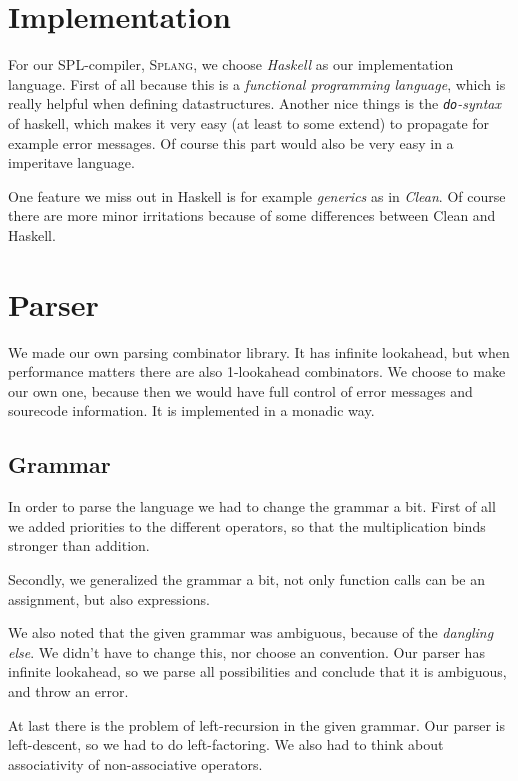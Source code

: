 \documentclass[14pt]{amsart}
\title{\splang}
\author{Wouter Geraedts (0814857) \and Joshua Moerman (3009048)}
\date{}
\newcommand{\splang}{\textsc{Splang}\xspace}
\begin{document}
\maketitle

\tableofcontents

\section{Implementation}
For our SPL-compiler, \splang, we choose \emph{Haskell} as our implementation language. First of all because this is a \emph{functional programming language}, which is really helpful when defining datastructures. Another nice things is the \emph{\texttt{do}-syntax} of haskell, which makes it very easy (at least to some extend) to propagate for example error messages. Of course this part would also be very easy in a imperitave language.

One feature we miss out in Haskell is for example \emph{generics} as in \emph{Clean}. Of course there are more minor irritations because of some differences between Clean and Haskell.

\section{Parser}
We made our own parsing combinator library. It has infinite lookahead, but when performance matters there are also 1-lookahead combinators. We choose to make our own one, because then we would have full control of error messages and sourecode information. It is implemented in a monadic way.

\subsection{Grammar}
In order to parse the language we had to change the grammar a bit. First of all we added priorities to the different operators, so that the multiplication binds stronger than addition.

Secondly, we generalized the grammar a bit, not only function calls can be an assignment, but also expressions.

We also noted that the given grammar was ambiguous, because of the \emph{dangling else}. We didn't have to change this, nor choose an convention. Our parser has infinite lookahead, so we parse all possibilities and conclude that it is ambiguous, and throw an error.

At last there is the problem of left-recursion in the given grammar. Our parser is left-descent, so we had to do left-factoring. We also had to think about associativity of non-associative operators.
\end{document}
